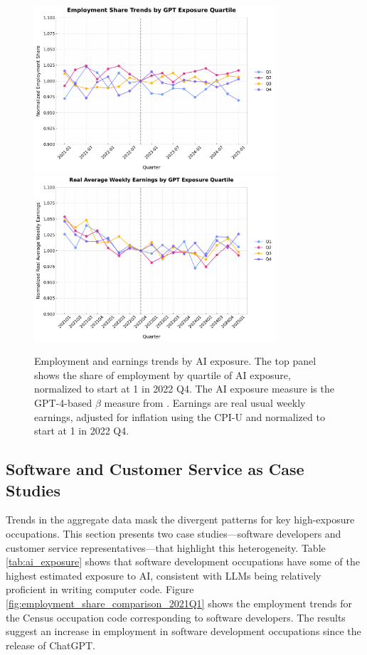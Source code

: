 \documentclass[12pt]{article}
\numberwithin{equation}{section}
\theoremstyle{theorem}\newcustomtheorem{theorem}{{\bf\sc Theorem}}
\theoremstyle{definition}\newcustomtheorem{assumption}{{\bf\sc Assumption}}
\theoremstyle{theorem} \newcustomtheorem{proposition}{{\bf\sc Proposition}}
\begin{document}
\begin{figure}[htbp]
	\centering
  \includegraphics[width=0.8\textwidth]{../figures/employment_share_by_gpt4_beta_quartile_2021q1.pdf}
  \includegraphics[width=0.8\textwidth]{../figures/real_earnings_by_gpt4_beta_quartile_2021q1.pdf}
	\caption{Employment and earnings trends by AI exposure. The top panel shows the share of employment by quartile of AI exposure, normalized to start at 1 in 2022 Q4. The AI exposure measure is the GPT-4-based $\beta$ measure from \citet{eloundou_gpts_2023}. Earnings are real usual weekly earnings, adjusted for inflation using the CPI-U and normalized to start at 1 in 2022 Q4.}
	\label{fig:employment_trends}
\end{figure}




\subsection{Software and Customer Service as Case Studies} 

Trends in the aggregate data mask the divergent patterns for key high-exposure occupations. This section presents two case studies—software developers and customer service representatives—that highlight this heterogeneity. Table \ref{tab:ai_exposure} shows that software development occupations have some of the highest estimated exposure to AI, consistent with LLMs being relatively proficient in writing computer code. Figure \ref{fig:employment_share_comparison_2021Q1} shows the employment trends for the Census occupation code corresponding to software developers. The results suggest an increase in employment in software development occupations since the release of ChatGPT. 
\end{document}
